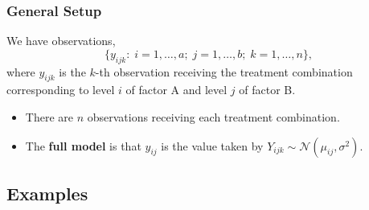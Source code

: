 \documentclass[a4paper]{article}\usepackage[]{graphicx}\usepackage[]{xcolor}
\begin{document}
\subsubsection{General Setup}
We have observations,
\[
	\{y_{ijk}:\;i=1,\dotsc,a;\;j=1,\dotsc,b;\;k=1,\dotsc,n\},
\]
where \( y_{ijk} \) is the \( k \)-th observation receiving the treatment combination corresponding to level \( i \) of factor A and level \( j \) of factor B.
\begin{itemize}
	\item There are \( n \) observations receiving each treatment combination.
	\item The \textbf{full model} is that \( y_{ij} \) is the value taken by \( Y_{ijk} \sim \mathcal{N} (\mu_{ij}, \sigma^2) \). 
\end{itemize}
\subsection{Examples}
\end{document}
